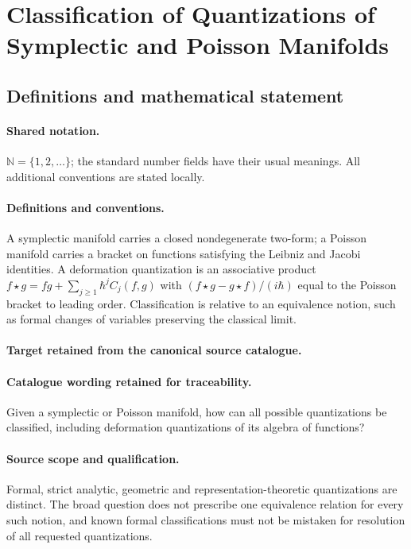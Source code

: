 \documentclass[11pt]{article}
\begin{document}
\section{Classification of Quantizations of Symplectic and Poisson Manifolds}\label{statement}

\subsection{Definitions and mathematical statement}

\paragraph{Shared notation.}$\mathbb N=\{1,2,\ldots\}$; the standard number fields have their usual meanings. All additional conventions are stated locally.


\paragraph{Definitions and conventions.}
A symplectic manifold carries a closed nondegenerate two-form; a Poisson manifold carries a bracket on functions satisfying the Leibniz and Jacobi identities. A deformation quantization is an associative product $f\star g=fg+\sum_{j\geq1}\hbar^j C_j(f,g)$ with $(f\star g-g\star f)/(i\hbar)$ equal to the Poisson bracket to leading order. Classification is relative to an equivalence notion, such as formal changes of variables preserving the classical limit.

\paragraph{Target retained from the canonical source catalogue.}
\paragraph{Catalogue wording retained for traceability.}
Given a symplectic or Poisson manifold, how can all possible quantizations be classified, including deformation quantizations of its algebra of functions?

\paragraph{Source scope and qualification.}
Formal, strict analytic, geometric and representation-theoretic quantizations are distinct. The broad question does not prescribe one equivalence relation for every such notion, and known formal classifications must not be mistaken for resolution of all requested quantizations.
\end{document}
